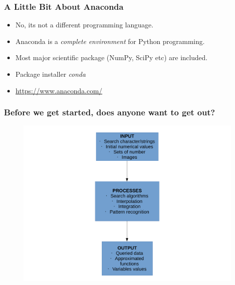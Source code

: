 \begin{frame}
\frametitle{A Little Bit About Anaconda}
\begin{itemize}
\item No, its not a different programming language.
\item Anaconda is a \emph{complete environment} for Python programming.
\item Most major scientific package (NumPy, SciPy etc) are included.
\item Package installer \emph{conda}

\item \url{https://www.anaconda.com/}
\end{itemize}

\end{frame}
\begin{frame}[fragile]
\frametitle{Before we get started, does anyone want to get out?}
\begin{figure}
\includegraphics[width=0.8\linewidth]{ProgrammingFlow.pdf}
\end{figure}
\end{frame}

